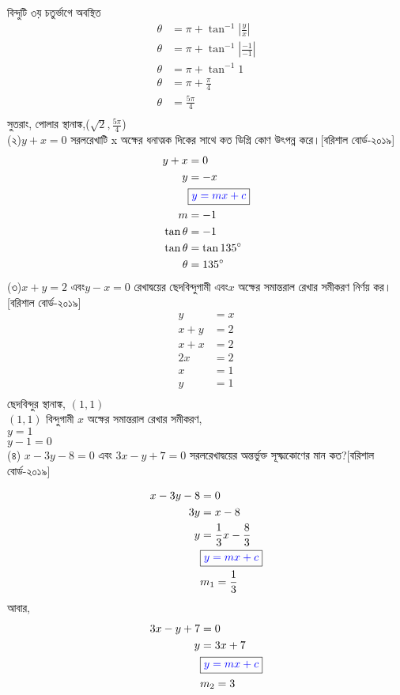 \documentclass{article}
\begin{document}
  বিন্দুটি ৩য় চতুর্ভাগে অবস্থিত\\
  \begin{align*}
  	\theta&=\pi+\tan^{-1}|\frac{y}{x}|\\
  	\theta&=\pi+\tan^{-1}|\frac{-1}{-1}|\\
  	\theta&=\pi+\tan^{-1} 1\\
  	\theta&=\pi+\frac{\pi}{4}\\
  	\theta&=\frac{5\pi}{4}\\
  \end{align*}
  সুতরাং, পোলার স্থানাঙ্ক,($\sqrt{2},\frac{5\pi}{4}$) \\ 
 (২)$y+x=0$ সরলরেখাটি  x অক্ষের ধনাত্মক দিকের সাথে কত ডিগ্রি কোণ উৎপন্ন করে।[বরিশাল বোর্ড-২০১৯]\\
  \begin{align*}
  	y+x&=0\\
  	y&=-x\\
  	&\boxed{\textcolor{blue}{y=mx+c}}\\
  	m&=-1\\
  	  	\tan \theta&=-1\\
  		\tan \theta&=\tan135\degree\\
  	\theta&=135\degree\\
  \end{align*}
(৩)$x+y=2$ এবং$y-x=0$ রেখাদ্বয়ের ছেদবিন্দুগামী এবং$x$ অক্ষের সমান্তরাল রেখার সমীকরণ নির্ণয় কর।[বরিশাল বোর্ড-২০১৯]\\
\begin{align*}
	y&=x\\
	x+y&=2\\
	x+x&=2\\
	2x&=2\\
	x&=1\\
	y&=1\\
\end{align*}
ছেদবিন্দুর স্থানাঙ্ক, $(1,1)$\\
$(1,1)$ বিন্দুগামী $x$ অক্ষের সমান্তরাল রেখার সমীকরণ,\\
$y=1$\\
$y-1=0$\\
(৪) $x-3y-8=0$ এবং $3x-y+7=0$ সরলরেখাদ্বয়ের  অন্তর্ভুক্ত সূক্ষ্মকোণের মান কত?[বরিশাল বোর্ড-২০১৯]\\
\begin{multicols}{2}
\begin{align*}
	x-3y-8&=0\\
	3y&=x-8\\
	y&=\frac{1}{3}x-\frac{8}{3}\\
	&\boxed{\textcolor{blue}{y=mx+c}}\\
	&m_1=\frac{1}{3}
\end{align*}
আবার,\\
\begin{align*}
	3x-y+7&=0\\
	y&=3x+7\\
	&\boxed{\textcolor{blue}{y=mx+c}}\\
	&m_2=3
\end{align*}
\end{multicols}
\end{document}
